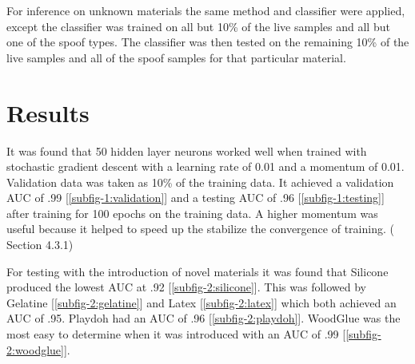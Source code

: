 \documentclass[]{article}
\begin{document}
For inference on unknown materials the same method and classifier were applied, except the classifier was trained on all but 10\% of the live samples and all but one of the spoof types. The classifier was then tested on the remaining 10\% of the live samples and all of the spoof samples for that particular material. 
\section{Results}
It was found that 50 hidden layer neurons worked well when trained with stochastic gradient descent with a learning rate of 0.01 and a momentum of 0.01. Validation data was taken as 10\% of the training data. It achieved a validation AUC of .99 [\ref{subfig-1:validation}] and a testing AUC of .96 [\ref{subfig-1:testing}] after training for 100 epochs on the training data. A higher momentum was useful because it helped to speed up the stabilize the convergence of training. (\cite{book} Section 4.3.1)  

For testing with the introduction of novel materials it was found that Silicone produced the lowest AUC at .92 [\ref{subfig-2:silicone}]. This was followed by Gelatine [\ref{subfig-2:gelatine}] and Latex [\ref{subfig-2:latex}] which both achieved an AUC of .95. Playdoh had an AUC of .96 [\ref{subfig-2:playdoh}]. WoodGlue was the most easy to determine when it was introduced with an AUC of .99 [\ref{subfig-2:woodglue}].
\end{document}
